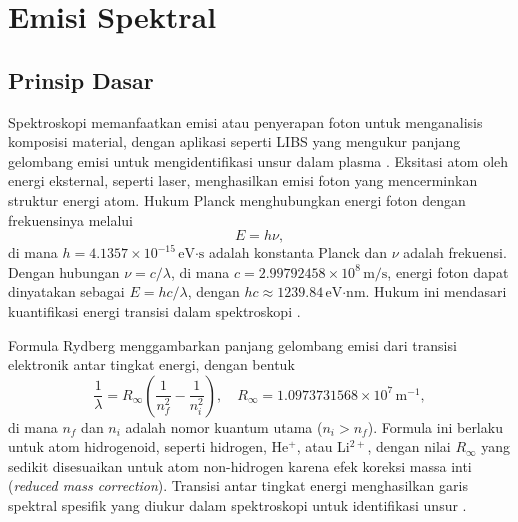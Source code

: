 \section{Emisi Spektral}

\subsection{Prinsip Dasar}

Spektroskopi memanfaatkan emisi atau penyerapan foton untuk menganalisis komposisi material, dengan aplikasi seperti LIBS yang mengukur panjang gelombang emisi untuk mengidentifikasi unsur dalam plasma \citep{CremersRadzemski2013}. Eksitasi atom oleh energi eksternal, seperti laser, menghasilkan emisi foton yang mencerminkan struktur energi atom. Hukum Planck menghubungkan energi foton dengan frekuensinya melalui
\begin{equation}
E = h\nu, \label{eq:bab2_eq1}
\end{equation}
di mana \( h = 4.1357 \times 10^{-15} \, \text{eV·s} \) adalah konstanta Planck dan \( \nu \) adalah frekuensi. Dengan hubungan \( \nu = c/\lambda \), di mana \( c = 2.99792458 \times 10^8 \, \text{m/s} \), energi foton dapat dinyatakan sebagai \( E = hc/\lambda \), dengan \( hc \approx 1239.84 \, \text{eV·nm} \). Hukum ini mendasari kuantifikasi energi transisi dalam spektroskopi \citep{Beiser1992}.

Formula Rydberg menggambarkan panjang gelombang emisi dari transisi elektronik antar tingkat energi, dengan bentuk
\begin{equation}
\frac{1}{\lambda} = R_\infty \left( \frac{1}{n_f^2} - \frac{1}{n_i^2} \right), \quad R_\infty = 1.0973731568 \times 10^7 \, \text{m}^{-1}, \label{eq:rydberg}
\end{equation}
di mana \( n_f \) dan \( n_i \) adalah nomor kuantum utama (\( n_i > n_f \)). Formula ini berlaku untuk atom hidrogenoid, seperti hidrogen, He\(^+ \), atau Li\(^{2+} \), dengan nilai \( R_\infty \) yang sedikit disesuaikan untuk atom non-hidrogen karena efek koreksi massa inti (\textit{reduced mass correction}). Transisi antar tingkat energi menghasilkan garis spektral spesifik yang diukur dalam spektroskopi untuk identifikasi unsur \citep{Griffiths2005}.

